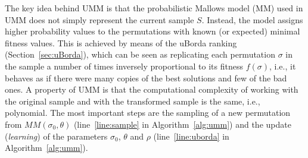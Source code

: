 \documentclass[runningheads]{llncs}
\begin{document}
The key idea behind UMM is that the probabilistic Mallows model (MM) used in
UMM does not simply represent the current sample $S$. Instead, the model
assigns higher probability values to the permutations with known (or expected)
minimal fitness values. This is achieved by means of the uBorda ranking
(Section~\ref{sec:uBorda}), which can be seen as replicating each permutation
$\sigma$ in the sample a number of times inversely proportional to its fitness
$f(\sigma)$, i.e., it behaves as if there were many copies of the best
solutions and few of the bad ones. A  property of UMM is that the
computational complexity of working with the original sample and with the
transformed sample is the same, i.e., polynomial. The most important steps are
the sampling of a new permutation from $MM(\sigma_0,\theta)$ (line~\ref{line:sample} in Algorithm~\ref{alg:umm}) and the update
(\emph{learning}) of the parameters $\sigma_0$, $\theta$ and $\rho$ (line~\ref{line:uborda} in Algorithm~\ref{alg:umm}).





\end{document}
